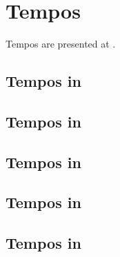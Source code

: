 



\chapter{Tempos}\label{Tempos}

Tempos are presented at .


\section{Tempos in \mxsrToMsr{}}


\section{Tempos in \mxsrToMsr{}}


\section{Tempos in \msrToMsr{}}


\section{Tempos in \msrToLpsr{}}


\section{Tempos in \lpsrToLilypond{}}


